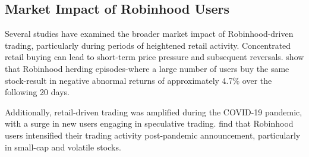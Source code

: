 \subsection{Market Impact of Robinhood Users}
Several studies have examined the broader market impact of Robinhood-driven trading, particularly during periods of heightened retail activity. Concentrated retail buying can lead to short-term price pressure and subsequent reversals. \cite{barber2021robinhood} show that Robinhood herding episodes-where a large number of users buy the same stock-result in negative abnormal returns of approximately 4.7\% over the following 20 days. 

Additionally, retail-driven trading was amplified during the COVID-19 pandemic, with a surge in new users engaging in speculative trading. \cite{ardia2023fast} find that Robinhood users intensified their trading activity post-pandemic announcement, particularly in small-cap and volatile stocks. 


